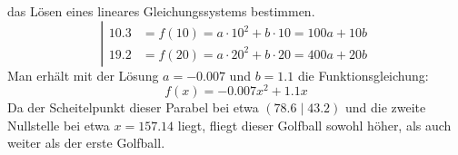 \begin{exercise}
\begin{enumerate}[a)]
            das Lösen eines lineares Gleichungssystems bestimmen.
            \begin{equation*}
              \left|
              \begin{aligned}
                \num{10.3}&=f(10)=a\cdot\num{10}^2+b\cdot\num{10}=100a+10b\\
                \num{19.2}&=f(20)=a\cdot\num{20}^2+b\cdot\num{20}=400a+20b
              \end{aligned}
              \right.
            \end{equation*}
            Man erhält mit der Lösung $a=\num{-0.007}$ und $b=\num{1.1}$ die Funktionsgleichung:
            \begin{equation*}
              f(x)=\num{-0.007}x^2+\num{1.1}x
            \end{equation*}
            Da der Scheitelpunkt dieser Parabel bei etwa $(\num{78.6}\mid\num{43.2})$
            und die zweite Nullstelle bei etwa $x=\num{157.14}$ liegt, fliegt dieser Golfball
            sowohl höher, als auch weiter als der erste Golfball.
    \end{enumerate}
  \fi
\end{exercise}
